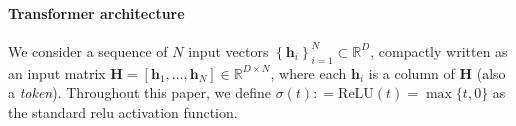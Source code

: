 \documentclass[10pt]{article}
\newcommand{\<}{\left\langle}
\renewcommand{\>}{\right\rangle}
\newcommand{\relu}{\mathrm{ReLU}}
\newcommand{\set}[1]{{\left\{ #1 \right\}}}
\newcommand{\sets}[1]{{\{ #1 \}}}
\newcommand{\defeq}{\mathrel{\mathop:}=}
\newcommand{\R}{\mathbb{R}}
\def\bH{{\mathbf H}}
\def\bh{{\mathbf h}}
\begin{document}
\paragraph{Transformer architecture} We consider a sequence of $N$ input vectors $\set{\bh_i}_{i=1}^N\subset \R^D$, compactly written as an input matrix $\bH=[\bh_1,\dots,\bh_N]\in \R^{D\times N}$, where each $\bh_i$ is a column of $\bH$ (also a \emph{token}). Throughout this paper, we define $\sigma(t)\defeq \relu(t)=\max\sets{t,0}$ as the standard relu activation function. 
\end{document}
